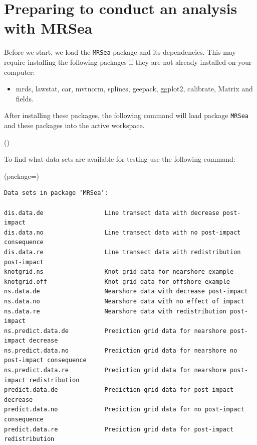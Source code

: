 \section{Preparing to conduct an analysis with MRSea} 
Before we start, we load the {\tt MRSea} package and its dependencies. 
This may require installing the following packages if they are not already installed on your computer: 
\begin{itemize}
\item mrds, lawstat, car, mvtnorm, splines, geepack, ggplot2, calibrate, Matrix and fields.
\end{itemize}
After installing these packages, the following command will load package {\tt MRSea} and these packages into the active workspace. 
\begin{knitrout}\footnotesize
{}\color{fgcolor}
\begin{kframe}
()
\end{kframe}
\end{knitrout}

To find what data sets are available for testing use the following command:\\
\begin{knitrout}\footnotesize
{}\color{fgcolor}
\begin{kframe}
(package=)
\end{kframe}
\begin{verbatim}
Data sets in package ‘MRSea’:

dis.data.de                 Line transect data with decrease post-impact
dis.data.no                 Line transect data with no post-impact consequence
dis.data.re                 Line transect data with redistribution post-impact
knotgrid.ns                 Knot grid data for nearshore example
knotgrid.off                Knot grid data for offshore example
ns.data.de                  Nearshore data with decrease post-impact
ns.data.no                  Nearshore data with no effect of impact
ns.data.re                  Nearshore data with redistribution post-impact
ns.predict.data.de          Prediction grid data for nearshore post-impact decrease
ns.predict.data.no          Prediction grid data for nearshore no post-impact consequence
ns.predict.data.re          Prediction grid data for nearshore post-impact redistribution
predict.data.de             Prediction grid data for post-impact decrease
predict.data.no             Prediction grid data for no post-impact consequence
predict.data.re             Prediction grid data for post-impact redistribution
\end{verbatim}
\end{knitrout}
